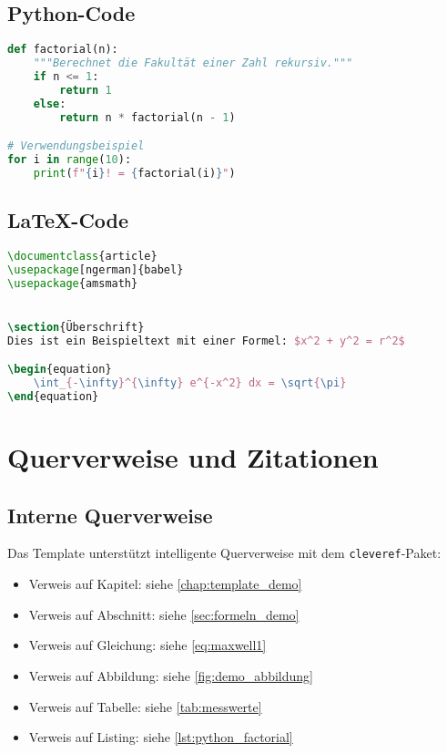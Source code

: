 \subsection*{Python-Code}
\label{subsec:python_code}

\begin{lstlisting}[caption={Python-Beispiel: Fakultätsfunktion},label={lst:python_factorial},language=Python]
def factorial(n):
    """Berechnet die Fakultät einer Zahl rekursiv."""
    if n <= 1:
        return 1
    else:
        return n * factorial(n - 1)

# Verwendungsbeispiel
for i in range(10):
    print(f"{i}! = {factorial(i)}")
\end{lstlisting}\label{lst:python_factorial}

\subsection*{LaTeX-Code}
\label{subsec:latex_code}

\begin{lstlisting}[caption={LaTeX-Beispiel: Dokumentstruktur},label={lst:latex_example},language=TeX]
\documentclass{article}
\usepackage[ngerman]{babel}
\usepackage{amsmath}


\section{Überschrift}
Dies ist ein Beispieltext mit einer Formel: $x^2 + y^2 = r^2$

\begin{equation}
    \int_{-\infty}^{\infty} e^{-x^2} dx = \sqrt{\pi}
\end{equation}

\end{lstlisting}

\section{Querverweise und Zitationen}
\label{sec:querverweise}

\subsection*{Interne Querverweise}
\label{subsec:querverweise_intern}

Das Template unterstützt intelligente Querverweise mit dem \texttt{cleveref}-Paket:
\begin{itemize}
	\item Verweis auf Kapitel: siehe \cref{chap:template_demo}
	\item Verweis auf Abschnitt: siehe \cref{sec:formeln_demo}
	\item Verweis auf Gleichung: siehe \cref{eq:maxwell1}
	\item Verweis auf Abbildung: siehe \cref{fig:demo_abbildung}
	\item Verweis auf Tabelle: siehe \cref{tab:messwerte}
	\item Verweis auf Listing: siehe \cref{lst:python_factorial}
\end{itemize}

